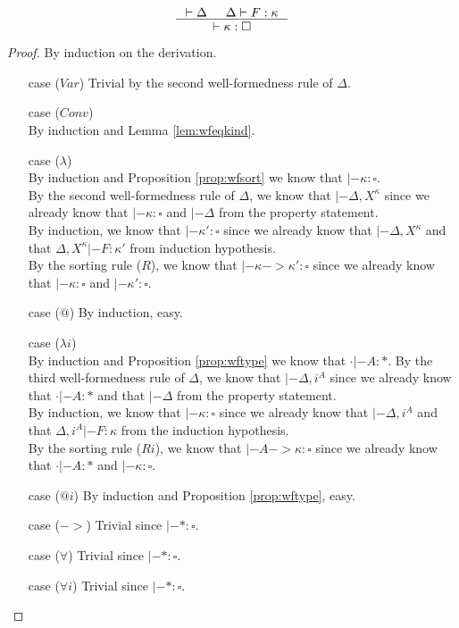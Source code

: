 \begin{proposition}
\label{prop:wfkind}
\[ \inference{ |- \Delta & \Delta |- F : \kappa}{ |- \kappa:\square }
\]
\end{proposition}
\begin{proof} By induction on the derivation.
\begin{itemize}
\item[case] ($Var$)
	Trivial by the second well-formedness rule of $\Delta$.
\item[case] ($Conv$) \\
	By induction and Lemma \ref{lem:wfeqkind}.
\item[case] ($\lambda$) \\
	By induction and Proposition \ref{prop:wfsort} we know
	that $|- \kappa:\square$.\\
	By the second well-formedness rule of $\Delta$,
	we know that $|- \Delta,X^\kappa$ since we already know
	that $|- \kappa:\square$ and $|- \Delta$ from the property statement.\\
	By induction, we know that $|- \kappa':\square$
	since we already know that $|- \Delta,X^\kappa$ and
	that $\Delta,X^\kappa|- F:\kappa'$ from induction hypothesis.\\
	By the sorting rule ($R$), we know that $|- \kappa -> \kappa':\square$
	since we already know that $|- \kappa:\square$ and $|- \kappa':\square$.
\item[case] ($@$)
	By induction, easy.
\item[case] ($\lambda i$)\\
	By induction and Proposition \ref{prop:wftype} we know
	that $\cdot|- A:*$.
	By the third well-formedness rule of $\Delta$,
	we know that $|- \Delta,i^A$ since we already know that $\cdot|- A:*$ and
	that $|- \Delta$ from the property statement.\\
	By induction, we know that $|- \kappa:\square$
	since we already know that $|- \Delta,i^A$ and
	that $\Delta,i^A|- F:\kappa$ from the induction hypothesis.\\
	By the sorting rule ($Ri$), we know that $|- A -> \kappa:\square$
	since we already know that $\cdot |- A:*$ and $|- \kappa:\square$.
\item[case] ($@i$)
	By induction and Proposition \ref{prop:wftype}, easy.
\item[case] ($->$)
	Trivial since $|- * : \square$.
\item[case] ($\forall$)
	Trivial since $|- * : \square$.
\item[case] ($\forall i$)
	Trivial since $|- * : \square$.
\end{itemize}
\end{proof}

